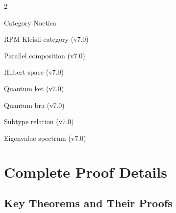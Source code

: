 \documentclass[11pt,twoside,openright]{book}
\theoremstyle{definition}
\theoremstyle{plain}
\theoremstyle{remark}
\newcommand{\Noetica}{\mathbf{Noetica}}
\newcommand{\RPM}{\mathfrak{R}}
\newcommand{\Hspace}{\mathcal{H}}
\newcommand{\qket}[1]{|#1\rangle}
\newcommand{\qbra}[1]{\langle#1|}
\newcommand{\pcomp}{\parallel}
\newcommand{\Kleisli}{\mathcal{K}}
\newcommand{\subtype}{<:}
\newcommand{\Spec}{\mathrm{Spec}}
\begin{document}
\begin{multicols}{2}
\begin{description}[leftmargin=2em,labelindent=0em]
\item[$\Noetica$] Category Noetica
\item[$\Kleisli_\RPM$] RPM Kleisli category (v7.0)
\item[$\pcomp$] Parallel composition (v7.0)
\item[$\Hspace$] Hilbert space (v7.0)
\item[$\qket{\cdot}$] Quantum ket (v7.0)
\item[$\qbra{\cdot}$] Quantum bra (v7.0)
\item[$\subtype$] Subtype relation (v7.0)
\item[$\Spec$] Eigenvalue spectrum (v7.0)
\end{description}
\end{multicols}

\chapter{Complete Proof Details}
\label{app:proofs}

\section{Key Theorems and Their Proofs}
\end{document}
